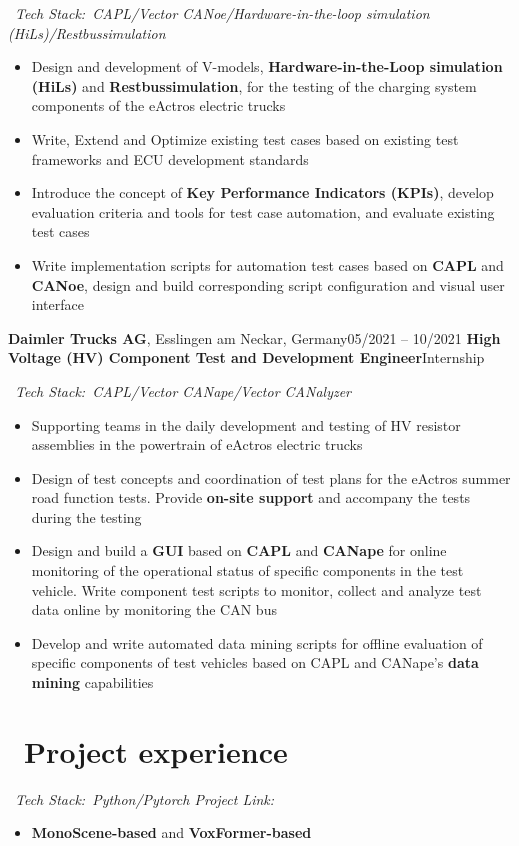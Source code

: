 \documentclass{resume}
\begin{document}
\ \textit{Tech Stack:\ CAPL/Vector CANoe/Hardware-in-the-loop simulation (HiLs)/Restbussimulation}
\begin{itemize}
  \item Design and development of V-models, \textbf{Hardware-in-the-Loop simulation (HiLs)} and \textbf{Restbussimulation}, for the testing of the charging system components of the eActros electric trucks
  \item Write, Extend and Optimize existing test cases based on existing test frameworks and ECU development standards
  \item Introduce the concept of \textbf{Key Performance Indicators (KPIs)}, develop evaluation criteria and tools for test case automation, and evaluate existing test cases
  \item Write implementation scripts for automation test cases based on \textbf{CAPL} and \textbf{CANoe}, design and build corresponding script configuration and visual user interface
\end{itemize}
\vspace{0.15cm}

\worksubsection
  {\textbf{Daimler Trucks AG}, Esslingen am Neckar, Germany}{05/2021 -- 10/2021}
\workpossubsection
  {\textbf{High Voltage (HV) Component Test and Development Engineer}}{Internship}

\ \textit{Tech Stack:\ CAPL/Vector CANape/Vector CANalyzer}
\begin{itemize}
  \item Supporting teams in the daily development and testing of HV resistor assemblies in the powertrain of eActros electric trucks
  \item Design of test concepts and coordination of test plans for the eActros summer road function tests. Provide \textbf{on-site support} and accompany the tests during the testing
  \item Design and build a \textbf{GUI} based on \textbf{CAPL} and \textbf{CANape} for online monitoring of the operational status of specific components in the test vehicle. Write component test scripts to monitor, collect and analyze test data online by monitoring the CAN bus
  \item Develop and write automated data mining scripts for offline evaluation of specific components of test vehicles based on CAPL and CANape's \textbf{data mining} capabilities
\end{itemize}
\vspace{0.15cm}

\section{\faFolder\ Project experience}
\ \textit{Tech Stack:\ Python/Pytorch \hfill Project Link:\ }
\begin{itemize}
  \item \textbf{MonoScene-based} and \textbf{VoxFormer-based}
\end{itemize}
\end{document}
